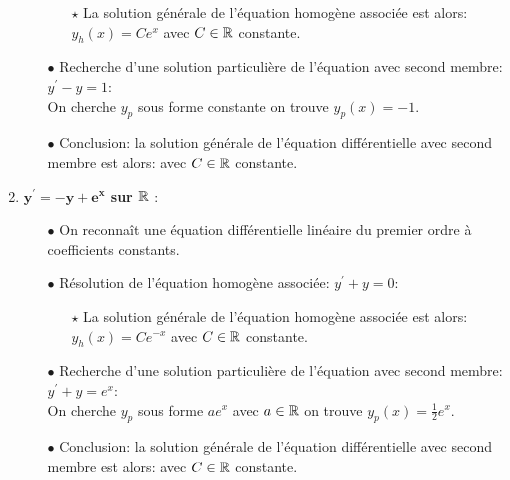 \documentclass[a4paper, 11pt,reqno]{article}
\begin{document}
\begin{correction}
\begin{enumerate}
\begin{itemize}
\begin{itemize}
\item[$\star$] La solution g\'en\'erale de l'\'equation homog\`{e}ne associ\'ee est alors: $y_h(x) = Ce^{x}$ avec $C\in\mathbb{R}$ constante.
\end{itemize}
\item[$\bullet$] Recherche d'une solution particuli\`{e}re de l'\'equation avec second membre: $y^{\prime}-y=1$:\\
\noindent On cherche $y_p$ sous forme constante on trouve $y_p(x)= -1$.
\item[$\bullet$] Conclusion: la solution g\'en\'erale de l'\'equation diff\'erentielle avec second membre est alors:  avec $C\in\mathbb{R}$ constante.
\end{itemize}

 \item \textbf{$\mathbf{y^{\prime}=-y+e^x}$ sur $\mathbb{R}$} :\\
 \begin{itemize}
\item[$\bullet$] On reconna\^{i}t une \'equation diff\'erentielle lin\'eaire du premier ordre \`{a} coefficients  constants.
\item[$\bullet$] R\'esolution de l'\'equation homog\`{e}ne associ\'ee: $y^{\prime}+y=0 $:\\
\begin{itemize}

\item[$\star$] La solution g\'en\'erale de l'\'equation homog\`{e}ne associ\'ee est alors: $y_h(x) = Ce^{-x}$ avec $C\in\mathbb{R}$ constante.
\end{itemize}
\item[$\bullet$] Recherche d'une solution particuli\`{e}re de l'\'equation avec second membre: $y^{\prime}+y=e^x$:\\
\noindent On cherche $y_p$ sous forme $ae^x$ avec $a\in \mathbb{R}$ on trouve $y_p(x)= \frac{1}{2}e^x$.
\item[$\bullet$] Conclusion: la solution g\'en\'erale de l'\'equation diff\'erentielle avec second membre est alors:  avec $C\in\mathbb{R}$ constante.
\end{itemize}
\end{enumerate}
\end{correction}
\end{document}

